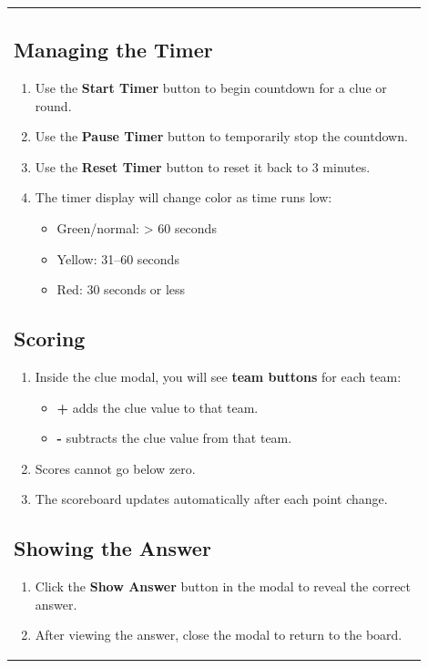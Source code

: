 \documentclass{article}
\begin{document}
\begin{flushleft}
\begin{tabular}{|p{0.9\linewidth}|}
\subsection*{Managing the Timer}

\begin{enumerate}[label=\arabic*.]
    \item Use the \textbf{Start Timer} button to begin countdown for a clue or round.
    \item Use the \textbf{Pause Timer} button to temporarily stop the countdown.
    \item Use the \textbf{Reset Timer} button to reset it back to 3 minutes.
    \item The timer display will change color as time runs low:
        \begin{itemize}
            \item Green/normal: > 60 seconds
            \item Yellow: 31--60 seconds
            \item Red: 30 seconds or less
        \end{itemize}
\end{enumerate}

\subsection*{Scoring}

\begin{enumerate}[label=\arabic*.]
    \item Inside the clue modal, you will see \textbf{team buttons} for each team:
        \begin{itemize}
            \item \textbf{+} adds the clue value to that team.
            \item \textbf{-} subtracts the clue value from that team.
        \end{itemize}
    \item Scores cannot go below zero.
    \item The scoreboard updates automatically after each point change.
\end{enumerate}

\subsection*{Showing the Answer}

\begin{enumerate}[label=\arabic*.]
    \item Click the \textbf{Show Answer} button in the modal to reveal the correct answer.
    \item After viewing the answer, close the modal to return to the board.
\end{enumerate}


\end{tabular}
\end{flushleft}
\end{document}
